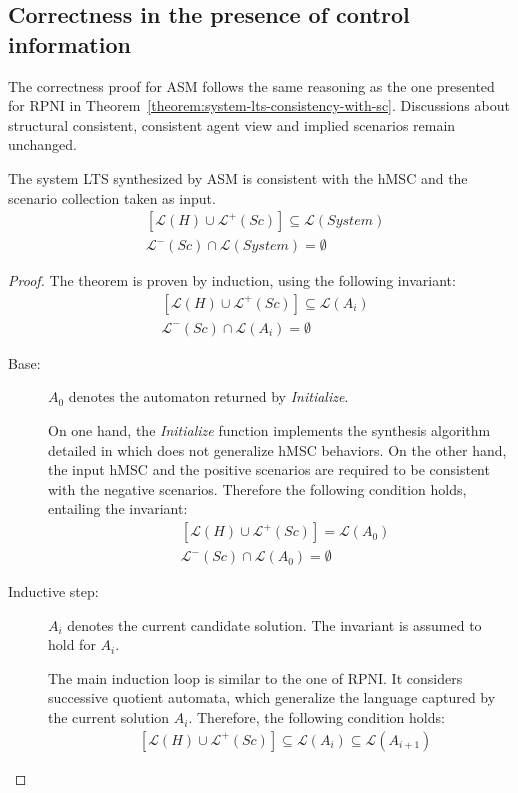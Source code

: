 
\subsection{Correctness in the presence of control information\label{subsection:correctness-of-asm}}

The correctness proof for ASM follows the same reasoning as the one presented for RPNI in Theorem~\ref{theorem:system-lts-consistency-with-sc}. Discussions about structural consistent, consistent agent view and implied scenarios remain unchanged. 

\begin{theorem}
The system LTS synthesized by ASM is consistent with the hMSC and the scenario collection taken as input.
\begin{align*}
&[\mathcal{L}(H)   \cup \mathcal{L}^+(Sc)] \subseteq \mathcal{L}(System)\\
&\mathcal{L}^-(Sc) \cap \mathcal{L}(System) = \emptyset
\end{align*}
\begin{proof}
The theorem is proven by induction, using the following invariant:
\begin{align*}
&[\mathcal{L}(H) \cup \mathcal{L}^+(Sc)] \subseteq \mathcal{L}(A_i)\\
&\mathcal{L}^-(Sc) \cap \mathcal{L}(A_i) = \emptyset
\end{align*}

\begin{description}
\item[Base:] $A_0$ denotes the automaton returned by \emph{Initialize}.

On one hand, the \emph{Initialize} function implements the synthesis algorithm detailed in \cite{Uchitel:2003} which does not generalize hMSC behaviors. On the other hand, the input hMSC and the positive scenarios are required to be consistent with the negative scenarios. Therefore the following condition holds, entailing the invariant:
\begin{align*}
&[\mathcal{L}(H) \cup \mathcal{L}^+(Sc)] = \mathcal{L}(A_0)\\
&\mathcal{L}^-(Sc) \cap \mathcal{L}(A_0) = \emptyset
\end{align*}

\item[Inductive step:] $A_i$ denotes the current candidate solution. The invariant is assumed to hold for $A_i$.

The main induction loop is similar to the one of RPNI. It considers successive quotient automata, which generalize the language captured by the current solution $A_i$. Therefore, the following condition holds:
\begin{align*}
&[\mathcal{L}(H) \cup \mathcal{L}^+(Sc)] \subseteq \mathcal{L}(A_i) \subseteq \mathcal{L}(A_{i+1})
\end{align*}


\end{description}
\end{proof}
\end{theorem}
